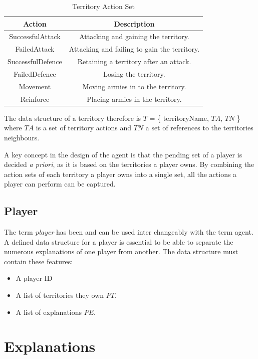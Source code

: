 \documentclass[parskip]{cs4rep}
\begin{document}
\begin{table}[ht]
\centering
\begin{tabular}{|c|c|}
\hline 
\textbf{Action} & \textbf{Description} \\ 
\hline 
SuccessfulAttack & Attacking and gaining the territory.\\ 
\hline 
FailedAttack & Attacking and failing to gain the territory.\\ 
\hline 
SuccessfulDefence & Retaining a territory after an attack.\\ 
\hline 
FailedDefence & Losing the territory.\\
\hline
Movement & Moving armies in to the territory.\\
\hline  
Reinforce & Placing armies in the territory.\\
\hline 
\end{tabular}
\caption{Territory Action Set}
\label{table:continent-bonus}
\end{table}

The data structure of a territory therefore is $T$ = \{ territoryName, $TA$, $TN$ \} where $TA$ is a set of territory actions and $TN$ a set of references to the territories neighbours.

A key concept in the design of the agent is that the pending set of a player is decided \textit{a priori}, as it is based on the territories a player owns. By combining the action sets of each territory a player owns into a single set, all the actions a player can perform can be captured.

\subsection{Player}

The term \textit{player} has been and can be used inter changeably with the term agent. A defined data structure for a player is essential to be able to separate the numerous explanations of one player from another. The data structure must contain these features:

\begin{itemize}
\item
A player ID
\item
A list of territories they own $PT$.
\item
A list of explanations $PE$.
\end{itemize}

\section{Explanations}
\end{document}
